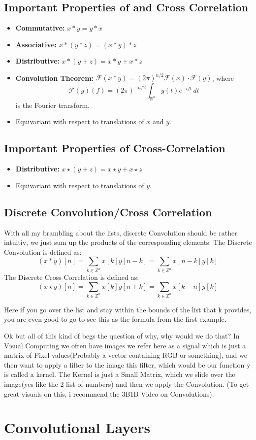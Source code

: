 \documentclass[a4paper]{article}
\begin{document}
\subsection*{Important Properties of  and Cross Correlation}

\begin{itemize}
    \item \textbf{Commutative:} \( x * y = y * x \)
    \item \textbf{Associative:} \( x * (y * z) = (x * y) * z \)
    \item \textbf{Distributive:} \( x * (y + z) = x * y + x * z \)
    \item \textbf{Convolution Theorem:} \( \mathcal{F}(x * y) = (2\pi)^{n/2} \mathcal{F}(x) \cdot \mathcal{F}(y) \), where
    \[
    \mathcal{F}(y)(f) = (2\pi)^{-n/2} \int_{\mathbb{R}^n} y(t) e^{-i f t} \, dt
    \]
    is the Fourier transform.
    \item Equivariant with respect to translations of \( x \) and \( y \).
\end{itemize}

\subsection*{Important Properties of Cross-Correlation}

\begin{itemize}
    \item \textbf{Distributive:} \( x \star (y + z) = x \star y + x \star z \)
    \item Equivariant with respect to translations of \( y \).
\end{itemize}
\subsection{Discrete Convolution/Cross Correlation}
With all my brambling about the lists, discrete Convolution should be rather intuitiv, we just sum up the products of the corresponding elements. The Discrete Convolution is defined as:
\[
(x * y)[n] = \sum_{k \in \mathbb{Z}^{n}} x[k] y[n - k] = \sum_{k \in \mathbb{Z}^{n}} x[n - k] y[k]  
\]
The Discrete Cross Correlation is defined as:
\[
(x \star y)[n] = \sum_{k \in \mathbb{Z}^{n}} x[k] y[n + k] = \sum_{k \in \mathbb{Z}^{n}} x[k-n] y[k]
\]

Here if you go over the list and stay within the bounds of the list that k provides, you are even good to go to see this as the formula from the first example. 

Ok but all of this kind of begs the question of why, why would we do that? In Visual Computing we often have images we refer here as a signal which is just a matrix of Pixel values(Probably a vector containing RGB or something), and we then want to apply a filter to the image this filter, which would be our function y is called a kernel. The Kernel is just a Small Matrix, which we slide over the image(yes like the 2 list of numbers) 
and then we apply the Convolution. (To get great visuals on this, i recommend the 3B1B Video on Convolutions). 

\section{Convolutional Layers}
\end{document}
